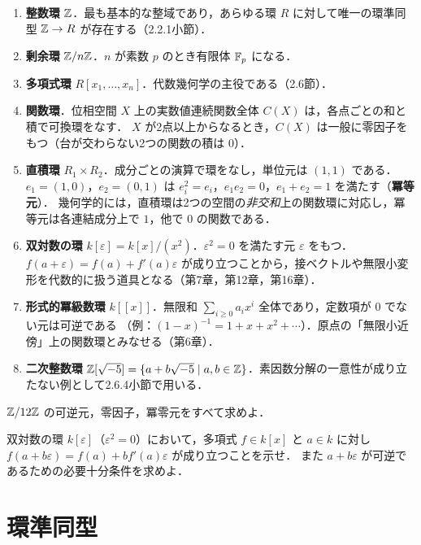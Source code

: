 \begin{enumerate}
  \item \textbf{整数環} $\mathbb{Z}$．最も基本的な整域であり，あらゆる環 $R$ に対して唯一の環準同型 $\mathbb{Z}\to R$ が存在する（2.2.1小節）．
  \item \textbf{剰余環} $\mathbb{Z}/n\mathbb{Z}$．$n$ が素数 $p$ のとき有限体 $\mathbb{F}_p$ になる．
  \item \textbf{多項式環} $R[x_1,\dots,x_n]$．代数幾何学の主役である（2.6節）．
  \item \textbf{関数環}．位相空間 $X$ 上の実数値連続関数全体 $C(X)$ は，各点ごとの和と積で可換環をなす．
        $X$ が2点以上からなるとき，$C(X)$ は一般に零因子をもつ（台が交わらない2つの関数の積は $0$）．
  \item \textbf{直積環} $R_1\times R_2$．成分ごとの演算で環をなし，単位元は $(1,1)$ である．
        $e_1=(1,0)$，$e_2=(0,1)$ は $e_i^2=e_i$，$e_1e_2=0$，$e_1+e_2=1$ を満たす（\textbf{冪等元}）．
        幾何学的には，直積環は2つの空間の\emph{非交和}上の関数環に対応し，冪等元は各連結成分上で $1$，他で $0$ の関数である．
  \item \textbf{双対数の環} $k[\varepsilon]=k[x]/(x^2)$．$\varepsilon^2=0$ を満たす元 $\varepsilon$ をもつ．
        $f(a+\varepsilon)=f(a)+f'(a)\varepsilon$ が成り立つことから，接ベクトルや無限小変形を代数的に扱う道具となる（第7章，第12章，第16章）．
  \item \textbf{形式的冪級数環} $k[[x]]$．無限和 $\sum_{i\ge0}a_ix^i$ 全体であり，定数項が $0$ でない元は可逆である
        （例：$(1-x)^{-1}=1+x+x^2+\cdots$）．原点の「無限小近傍」上の関数環とみなせる（第6章）．
  \item \textbf{二次整数環} $\mathbb{Z}[\sqrt{-5}]=\{a+b\sqrt{-5}\mid a,b\in\mathbb{Z}\}$．素因数分解の一意性が成り立たない例として2.6.4小節で用いる．
\end{enumerate}

$\mathbb{Z}/12\mathbb{Z}$ の可逆元，零因子，冪零元をすべて求めよ．

双対数の環 $k[\varepsilon]$（$\varepsilon^2=0$）において，多項式 $f\in k[x]$ と $a\in k$ に対し $f(a+b\varepsilon)=f(a)+bf'(a)\varepsilon$ が成り立つことを示せ．
また $a+b\varepsilon$ が可逆であるための必要十分条件を求めよ．

\section{環準同型}

